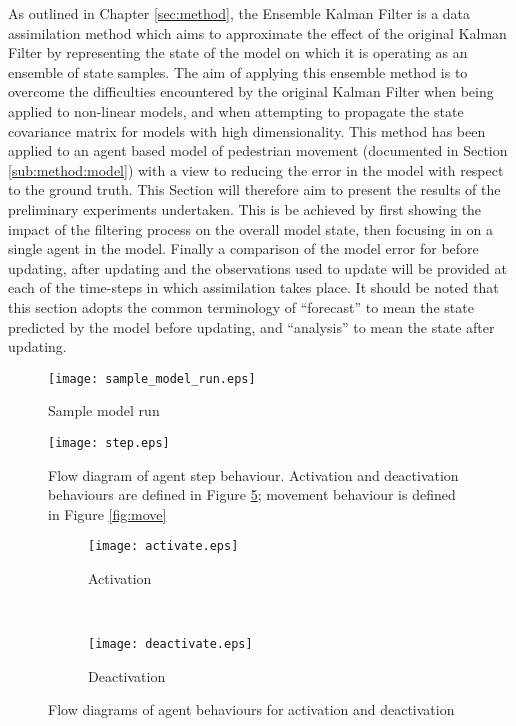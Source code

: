 As outlined in Chapter \ref{sec:method}, the Ensemble Kalman Filter is a data
assimilation method which aims to approximate the effect of the original Kalman
Filter by representing the state of the model on which it is operating as an
ensemble of state samples.
The aim of applying this ensemble method is to overcome the difficulties
encountered by the original Kalman Filter when being applied to non-linear
models, and when attempting to propagate the state covariance matrix for models
with high dimensionality.
This method has been applied to an agent based model of pedestrian movement
(documented in Section \ref{sub:method:model}) with a view to reducing the error
in the model with respect to the ground truth.
This Section will therefore aim to present the results of the preliminary
experiments undertaken.
This is be achieved by first showing the impact of the filtering process on the
overall model state, then focusing in on a single agent in the model.
Finally a comparison of the model error for before updating, after updating and
the observations used to update will be provided at each of the time-steps in
which assimilation takes place.
It should be noted that this section adopts the common terminology of
``forecast'' to mean the state predicted by the model before updating, and
``analysis'' to mean the state after updating.


\begin{figure}[h!]
    \centering
    \texttt{[image: sample\_model\_run.eps]}
    \caption{Sample model run}\label{fig:sample_model_run}
\end{figure}

\begin{figure}[h!]
    \centering
    \texttt{[image: step.eps]}
    \caption{Flow diagram of agent step behaviour. Activation and deactivation
        behaviours are defined in Figure \ref{fig:act_deact}; movement behaviour
    is defined in Figure \ref{fig:move}}\label{fig:step}
\end{figure}

\begin{figure}[h!]
    \centering
    \begin{subfigure}[h]{0.4\textwidth}
        \texttt{[image: activate.eps]}
        \caption{Activation}\label{fig:act_deact:act}
    \end{subfigure}
    ~
    \begin{subfigure}[h]{0.3\textwidth}
        \texttt{[image: deactivate.eps]}
        \caption{Deactivation}\label{fig:act_deact:deact}
    \end{subfigure}
    \caption{Flow diagrams of agent behaviours for activation and deactivation}
    \label{fig:act_deact}
\end{figure}

